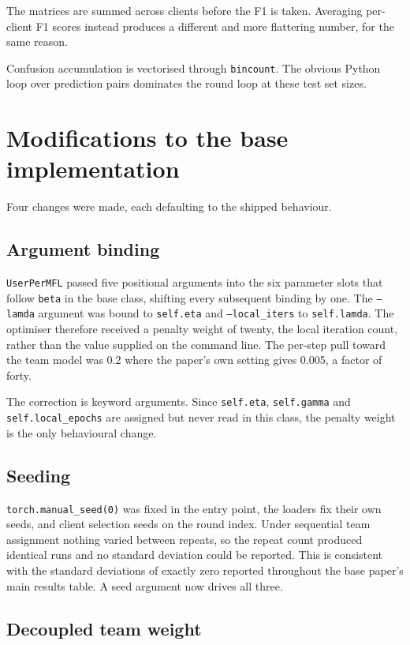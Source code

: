 The matrices are summed across clients before the F1 is taken. Averaging
per-client F1 scores instead produces a different and more flattering number,
for the same reason.

Confusion accumulation is vectorised through \texttt{bincount}. The obvious
Python loop over prediction pairs dominates the round loop at these test set
sizes.

\section{Modifications to the base implementation}
\label{sec:modifications}

Four changes were made, each defaulting to the shipped behaviour.

\subsection{Argument binding}

\texttt{UserPerMFL} passed five positional arguments into the six parameter
slots that follow \texttt{beta} in the base class, shifting every subsequent
binding by one. The \texttt{--lamda} argument was bound to \texttt{self.eta} and
\texttt{--local\_iters} to \texttt{self.lamda}. The optimiser therefore received
a penalty weight of twenty, the local iteration count, rather than the value
supplied on the command line. The per-step pull toward the team model was 0.2
where the paper's own setting gives 0.005, a factor of forty.

The correction is keyword arguments. Since \texttt{self.eta},
\texttt{self.gamma} and \texttt{self.local\_epochs} are assigned but never read
in this class, the penalty weight is the only behavioural change.

\subsection{Seeding}

\texttt{torch.manual\_seed(0)} was fixed in the entry point, the loaders fix
their own seeds, and client selection seeds on the round index. Under sequential
team assignment nothing varied between repeats, so the repeat count produced
identical runs and no standard deviation could be reported. This is consistent
with the standard deviations of exactly zero reported throughout the base
paper's main results table. A seed argument now drives all three.

\subsection{Decoupled team weight}


